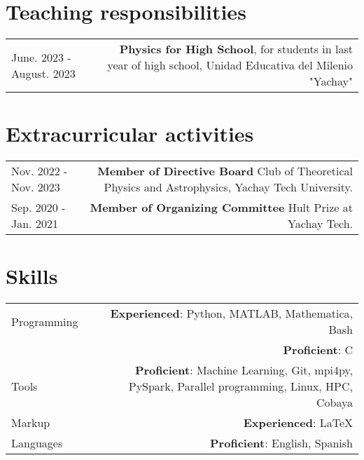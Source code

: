 \documentclass{article}
\begin{document}
\section*{Teaching responsibilities}

\begin{tabular}{L!{\vrule}R}

  June. 2023 - August. 2023 & \textbf{Physics for High School}, for students in last year of high school, Unidad Educativa del Milenio "Yachay"\\

\end{tabular}


\section*{Extracurricular activities}
\begin{tabular}{L!{\vrule}R}

  Nov. 2022 - Nov. 2023 & \textbf{Member of Directive Board} Club of Theoretical Physics and Astrophysics, Yachay Tech University. \\

  Sep. 2020 - Jan. 2021 & \textbf{Member of Organizing Committee} Hult Prize at Yachay Tech. \\
\end{tabular}

\section*{Skills}

\begin{tabular}{L!{\vrule}R}
	Programming & \textbf{Experienced}: Python, MATLAB, Mathematica, Bash \\
              &\textbf{Proficient}: C \\
  Tools & \textbf{Proficient}: Machine Learning, Git, mpi4py, PySpark, Parallel programming, Linux, HPC, Cobaya\\
	Markup & \textbf{Experienced}: LaTeX\\
	Languages & \textbf{Proficient}: English, Spanish\\
\end{tabular}
\end{document}
